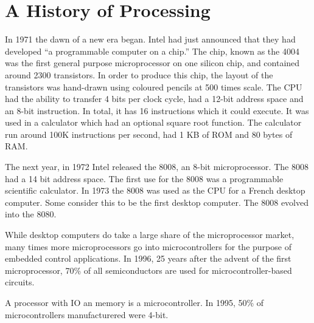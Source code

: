 \section{A History of Processing}
In 1971 the dawn of a new era began. Intel had just announced that they had developed ``a programmable computer on a chip.'' The chip, known as the 4004 was the first general purpose microprocessor on one silicon chip, and contained around 2300 transistors. In order to produce this chip, the layout of the transistors was hand-drawn using coloured pencils at 500 times scale. The CPU had the ability to transfer 4 bits per clock cycle, had a 12-bit address space and an 8-bit instruction. In total, it has 16 instructions which it could execute. It was used in a calculator which had an optional square root function. The calculator run around 100K instructions per second, had 1 KB of ROM and 80 bytes of RAM. 

The next year, in 1972 Intel released the 8008, an 8-bit microprocessor. The 8008 had a 14 bit address space. The first use for the 8008 was a programmable scientific calculator. In 1973 the 8008 was used as the CPU for a French desktop computer. Some consider this to be the first desktop computer. The 8008 evolved into the 8080. 

While desktop computers do take a large share of the microprocessor market, many times more microprocessors go into microcontrollers for the purpose of embedded control applications. In 1996, 25 years after the advent of the first microprocessor, 70\% of all semiconductors are used for microcontroller-based circuits. 

A processor with IO an memory is a microcontroller. In 1995, 50\% of microcontrollers manufacturered were 4-bit. 
